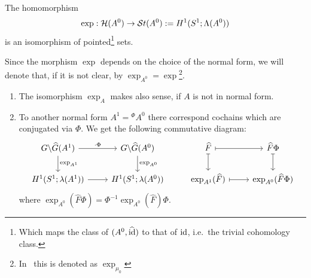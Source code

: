 \begin{tthm} \label{thm:mainThm1}
  The homomorphism
  \[
    \exp:\mathcal{H}(A^0)\to\mathcal{S}{}t(A^0):=H^1(S^1;\Lambda(A^0))
  \]
  is an isomorphism of pointed\footnote{Which maps the class of
  $(A^0,\widehat{\operatorname{id}})$ to that of $\operatorname{id}$, i.e.\ the trivial cohomology class.} sets.
\end{tthm}
\begin{rem}
  \begin{s-defn}
    Since the morphism $\exp$ depends on the choice of the normal form, we will
    denote that, if it is not clear, by
    $\exp_{A^0}=\exp$\footnote{In~\cite{Loday1994} this is denoted as
    $\exp_{\mu_0}$}.
  \end{s-defn}
  \begin{enumerate}
    \item {}
      The isomorphism $\exp_A$ makes also sense, if $A$ is not in normal form.
    \item {}
      To another normal form $A^1={}^\Phi\!A^0$ there correspond cochains which
      are conjugated via $\Phi$.
      We get the following commutative diagram:
      \[ \begin{tikzcd}
          G\backslash\hat G(A^1) \rar{\cdot\Phi}\dar{\exp_{A^1}}
          & G\backslash\hat G(A^0) \dar{\exp_{A^0}}
          & \hat F \arrow[|->]{r}\arrow[|->]{d}
          & \hat F\Phi \arrow[|->]{d}
        \\ H^1(S^1;\lambda(A^1)) \rar
          & H^1(S^1;\lambda(A^0))
          & \exp_{A^1}(\hat F) \arrow[|->]{r}
          & \exp_{A^0}(\hat F\Phi)
      \end{tikzcd} \]
      where $\exp_{A^0}(\hat F\Phi)=\Phi^{-1}\exp_{A^0}(\hat F)\Phi$.
      \TODO[$\Phi\in G(\!(t)\!)$???]
  \end{enumerate}
\end{rem}

